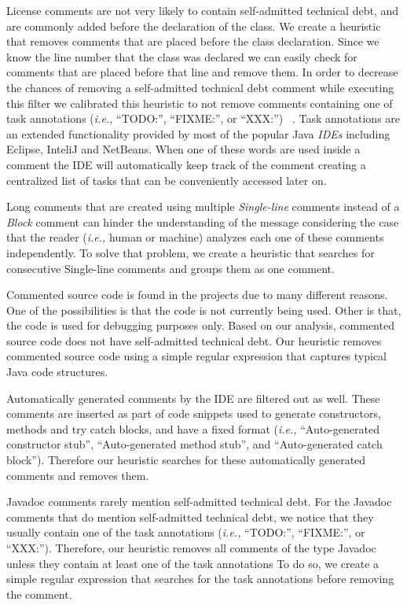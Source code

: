 License comments are not very likely to contain self-admitted technical debt, and are commonly added before the declaration of the class. We create a heuristic that removes comments that are placed before the class declaration. Since we know the line number that the class was declared we can easily check for comments that are placed before that line and remove them. In order to decrease the chances of removing a self-admitted technical debt comment while executing this filter we calibrated this heuristic to not remove comments containing one of task annotations (\textit{i.e.,} ``TODO:'', ``FIXME:'', or ``XXX:'') ~\cite{Storey2008ICSE}. Task annotations are an extended functionality provided by most of the popular Java \textit{IDEs} including Eclipse, InteliJ and NetBeans. When one of these words are used inside a comment the IDE will automatically keep track of the comment creating a centralized list of tasks that can be conveniently accessed later on.

Long comments that are created using multiple \emph{Single-line} comments instead of a \emph{Block} comment can hinder the understanding of the message considering the case that the reader (\textit{i.e.,} human or machine) analyzes each one of these comments independently. To solve that problem, we create a heuristic that searches for consecutive Single-line comments and groups them as one comment.
 
Commented source code is found in the projects due to many different reasons. One of the possibilities is that the code is not currently being used. Other is that, the code is used for debugging purposes only. Based on our analysis, commented source code does not have self-admitted technical debt. Our heuristic removes commented source code using a simple regular expression that captures typical Java code structures.

Automatically generated comments by the IDE are filtered out as well. These comments are inserted as part of code snippets used to generate constructors, methods and try catch blocks, and have a fixed format (\textit{i.e.,} ``Auto-generated constructor stub'', ``Auto-generated method stub'', and ``Auto-generated catch block''). Therefore our heuristic searches for these automatically generated comments and removes them. 

Javadoc comments rarely mention self-admitted technical debt. For the Javadoc comments that do mention self-admitted technical debt, we notice that they usually contain one of the task annotations (\textit{i.e.,} ``TODO:'', ``FIXME:'', or ``XXX:''). Therefore, our heuristic removes all comments of the type Javadoc unless they contain at least one of the task annotations  To do so, we create a simple regular expression that searches for the task annotations before removing the comment.  

